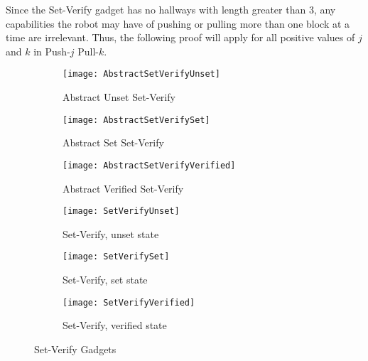 Since the Set-Verify gadget has no hallways with length greater than 3, any capabilities the robot may have of pushing or pulling more than one block at a time are irrelevant. Thus, the following proof will apply for all positive values of $j$ and $k$ in Push-$j$ Pull-$k$.

%

\begin{figure}[!ht]
  \centering
    \begin{subfigure}[b]{0.3\textwidth}
    \texttt{[image: AbstractSetVerifyUnset]}
    \caption{Abstract Unset Set-Verify}
    \vspace{15pt}
    \end{subfigure}
    \hfill
    \begin{subfigure}[b]{0.3\textwidth}
    \texttt{[image: AbstractSetVerifySet]}
    \caption{Abstract Set Set-Verify}
    \vspace{15pt}
    \end{subfigure}
    \hfill
    \begin{subfigure}[b]{0.3\textwidth}
    \texttt{[image: AbstractSetVerifyVerified]}
    \caption{Abstract Verified Set-Verify}
    \vspace{15pt}
  \end{subfigure}  
   \vspace{10pt}
  \begin{subfigure}[b]{0.3\textwidth}
    \texttt{[image: SetVerifyUnset]}
    \caption{Set-Verify, unset state}
    \label{SetVerifyUnset}
  \end{subfigure}
  \hfill
  \begin{subfigure}[b]{0.3\textwidth}
    \texttt{[image: SetVerifySet]}
    \caption{Set-Verify, set state}
    \label{SetVerifySet}
  \end{subfigure}
  \hfill
  \begin{subfigure}[b]{0.3\textwidth}
    \texttt{[image: SetVerifyVerified]}
    \caption{Set-Verify, verified state}
    \label{SetVerifyVerified}
  \end{subfigure}
  \caption{Set-Verify Gadgets}
  \label{setVerifyDiagrams}
\end{figure}

